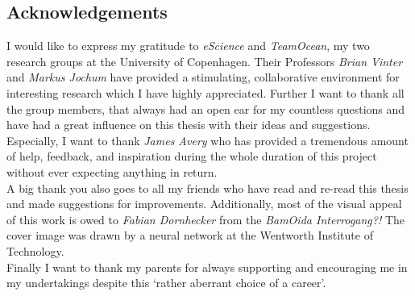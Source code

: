 \begin{vplace}[0.5]
\section*{Acknowledgements}%
\label{sec:acknowledgements}

I would like to express my gratitude to {\em eScience} and {\em TeamOcean}, my
two research groups at the University of Copenhagen. Their Professors {\em
Brian Vinter} and {\em Markus Jochum} have provided a stimulating,
collaborative environment for interesting research which I have highly
appreciated. Further I want to thank all the group members, that always had
an open ear for my countless questions and have had a great influence on this
thesis with their ideas and suggestions.  Especially, I want to thank {\em
James Avery} who has provided a tremendous amount of help, feedback, and
inspiration during the whole duration of this project without ever expecting
anything in return.\\

A big thank you also goes to all my friends who have read and re-read this
thesis and made suggestions for improvements. Additionally, most of the visual
appeal of this work is owed to {\em Fabian Dornhecker} from the {\em BamOida
Interrogang\rlap?!} The cover image was drawn by a neural network at the
Wentworth Institute of Technology.\\

Finally I want to thank my parents for always supporting and encouraging me in 
my undertakings despite this `rather aberrant choice of a career'.

\end{vplace}
